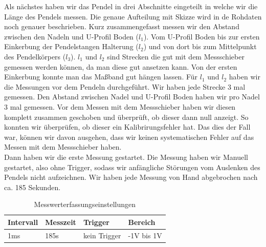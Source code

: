 \documentclass[twoside]{protokoll}
\begin{document}
 Als nächstes haben wir das Pendel in drei Abschnitte eingeteilt in welche wir die Länge des Pendels messen. 
 Die genaue Aufteilung mit Skizze wird in de Rohdaten noch genauer beschrieben. Kurz zusammengefasst messen wir den Abstand zwischen den Nadeln und U-Profil Boden ($l_1$).
Vom U-Profil Boden bis zur ersten Einkerbung der Pendelstangen Halterung ($l_2$) und von dort bis zum Mittelpunkt des Pendelkörpers ($l_3$).
$l_1$ und $l_2$ sind Strecken die gut mit dem Messschieber gemessen werden können, da man diese gut ansetzen kann. 
Von der ersten Einkerbung konnte man das Maßband gut hängen lassen.
Für $l_1$ und $l_2$ haben wir die Messungen vor dem Pendeln durchgeführt. 
Wir haben jede Strecke 3 mal gemessen. Den Abstand zwischen Nadel und U-Profil Boden haben wir pro Nadel 3 mal gemessen.
Vor dem Messen mit dem Messschieber haben wir diesen komplett zusammen geschoben und überprüft, ob dieser dann null anzeigt. 
So konnten wir überprüfen, ob dieser ein Kalibrirungsfehler hat.
Das dies der Fall war, können wir davon ausgehen, dass wir keinen systematischen Fehler auf das Messen mit dem Messschieber haben.\\

Dann haben wir die erste Messung gestartet. 
Die Messung haben wir Manuell gestartet, also ohne Trigger, sodass wir anfängliche Störungen vom Auslenken des Pendels nicht aufzeichnen. 
Wir haben jede Messung von Hand abgebrochen nach ca. 185 Sekunden. 

\begin{table}[H]
        \centering
        \begin{tabularx}{1.0\textwidth}{X X X X} %
            \toprule
            \textbf{Intervall} & \textbf{Messzeit} & \textbf{Trigger} & \textbf{Bereich} \\
            \midrule
            1ms & 185s & kein Trigger & -1V bis 1V \\
            \bottomrule
        \end{tabularx}
        \caption{Messwerterfassungseinstellungen}
        \label{tab:mytable}
    \end{table}
\end{document}

